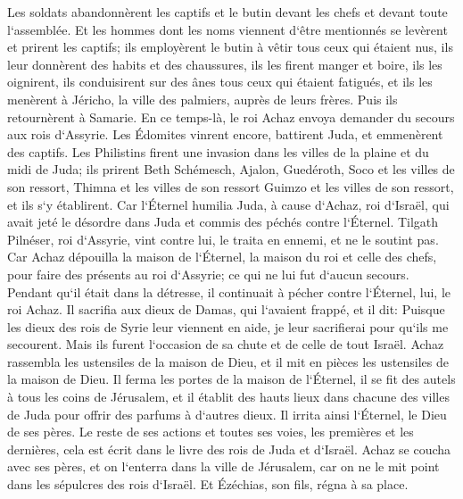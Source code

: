 \verse Les soldats abandonnèrent les captifs et le butin devant les chefs et devant toute l`assemblée. 
\verse Et les hommes dont les noms viennent d`être mentionnés se levèrent et prirent les captifs; ils employèrent le butin à vêtir tous ceux qui étaient nus, ils leur donnèrent des habits et des chaussures, ils les firent manger et boire, ils les oignirent, ils conduisirent sur des ânes tous ceux qui étaient fatigués, et ils les menèrent à Jéricho, la ville des palmiers, auprès de leurs frères. Puis ils retournèrent à Samarie. 
\verse En ce temps-là, le roi Achaz envoya demander du secours aux rois d`Assyrie. 
\verse Les Édomites vinrent encore, battirent Juda, et emmenèrent des captifs. 
\verse Les Philistins firent une invasion dans les villes de la plaine et du midi de Juda; ils prirent Beth Schémesch, Ajalon, Guedéroth, Soco et les villes de son ressort, Thimna et les villes de son ressort Guimzo et les villes de son ressort, et ils s`y établirent. 
\verse Car l`Éternel humilia Juda, à cause d`Achaz, roi d`Israël, qui avait jeté le désordre dans Juda et commis des péchés contre l`Éternel. 
\verse Tilgath Pilnéser, roi d`Assyrie, vint contre lui, le traita en ennemi, et ne le soutint pas. 
\verse Car Achaz dépouilla la maison de l`Éternel, la maison du roi et celle des chefs, pour faire des présents au roi d`Assyrie; ce qui ne lui fut d`aucun secours. 
\verse Pendant qu`il était dans la détresse, il continuait à pécher contre l`Éternel, lui, le roi Achaz. 
\verse Il sacrifia aux dieux de Damas, qui l`avaient frappé, et il dit: Puisque les dieux des rois de Syrie leur viennent en aide, je leur sacrifierai pour qu`ils me secourent. Mais ils furent l`occasion de sa chute et de celle de tout Israël. 
\verse Achaz rassembla les ustensiles de la maison de Dieu, et il mit en pièces les ustensiles de la maison de Dieu. Il ferma les portes de la maison de l`Éternel, il se fit des autels à tous les coins de Jérusalem, 
\verse et il établit des hauts lieux dans chacune des villes de Juda pour offrir des parfums à d`autres dieux. Il irrita ainsi l`Éternel, le Dieu de ses pères. 
\verse Le reste de ses actions et toutes ses voies, les premières et les dernières, cela est écrit dans le livre des rois de Juda et d`Israël. 
\verse Achaz se coucha avec ses pères, et on l`enterra dans la ville de Jérusalem, car on ne le mit point dans les sépulcres des rois d`Israël. Et Ézéchias, son fils, régna à sa place. 

\chapter{}

